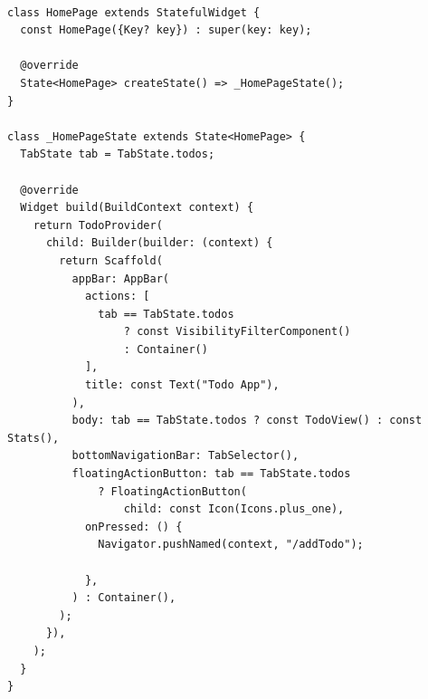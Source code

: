 	\mbox{}
	\begin{code}
	 \mbox{}
			\label{code:2.6}

	\begin{verbatim}

class HomePage extends StatefulWidget {
  const HomePage({Key? key}) : super(key: key);

  @override
  State<HomePage> createState() => _HomePageState();
}

class _HomePageState extends State<HomePage> {
  TabState tab = TabState.todos;

  @override
  Widget build(BuildContext context) {
    return TodoProvider(
      child: Builder(builder: (context) {
        return Scaffold(
          appBar: AppBar(
            actions: [
              tab == TabState.todos
                  ? const VisibilityFilterComponent()
                  : Container()
            ],
            title: const Text("Todo App"),
          ),
          body: tab == TabState.todos ? const TodoView() : const Stats(),
          bottomNavigationBar: TabSelector(),
          floatingActionButton: tab == TabState.todos
              ? FloatingActionButton(
                  child: const Icon(Icons.plus_one),
            onPressed: () {
              Navigator.pushNamed(context, "/addTodo");

            },
          ) : Container(),
        );
      }),
    );
  }
}
	\end{verbatim}
	\end{code}

